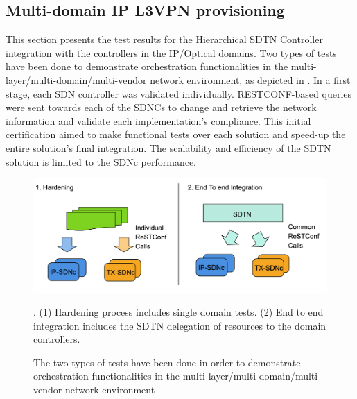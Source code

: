 \documentclass[10pt, conference]{IEEEtran}
\begin{document}


\subsection{Multi-domain IP L3VPN provisioning}

This section presents the test results for the Hierarchical SDTN Controller integration with the controllers in the IP/Optical domains. Two types of tests have been done to demonstrate orchestration functionalities in the multi-layer/multi-domain/multi-vendor network environment, as depicted in . In a first stage, each SDN controller was validated individually. RESTCONF-based queries were sent towards each of the SDNCs to change and retrieve the network information and validate each implementation's compliance. This initial certification aimed to make functional tests over each solution and speed-up the entire solution's final integration. The scalability and efficiency of the SDTN solution is limited to the SDNc performance.

\begin{figure}
	\centering
		\includegraphics[width=\linewidth]{figs/diagram-11.png}
	\caption{The two types of tests have been done in order to demonstrate orchestration functionalities in the multi-layer/multi-domain/multi-vendor network environment}. (1) Hardening process includes single domain tests. (2) End to end integration includes the SDTN delegation of resources to the domain controllers.
	\label{FIG:testing_workflow}
\end{figure}
\end{document}
